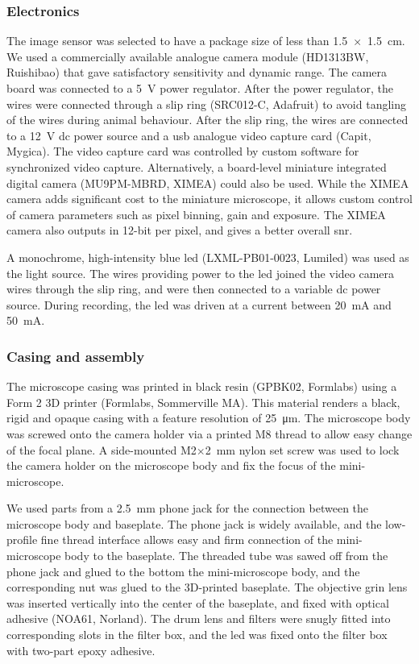 \subsubsection{Electronics}
The image sensor was selected to have a package size of less than \SI{1.5 x 1.5}{\cm}. We used a commercially available analogue camera module (HD1313BW, Ruishibao) that gave satisfactory sensitivity and dynamic range. The camera board was connected to a \SI{5}{\V} power regulator. After the power regulator, the wires were connected through a slip ring (SRC012-C, Adafruit) to avoid tangling of the wires during animal behaviour. After the slip ring, the wires are connected to a \SI{12}{\V} \gls{dc} power source and a \gls{usb} analogue video capture card (Capit, Mygica). The video capture card was controlled by custom software for synchronized video capture.  Alternatively, a board-level miniature integrated digital camera (MU9PM-MBRD, XIMEA) could also be used. While the XIMEA camera adds significant cost to the miniature microscope, it allows custom control of camera parameters such as pixel binning, gain and exposure. The XIMEA camera also outputs in 12-bit per pixel, and gives a better overall \gls{snr}.

A monochrome, high-intensity blue \gls{led} (LXML-PB01-0023, Lumiled) was used as the light source. The wires providing power to the \gls{led} joined the video camera wires through the slip ring, and were then connected to a variable \gls{dc} power source. During recording, the \gls{led} was driven at a current between \SI{20}{\mA} and \SI{50}{\mA}.

\subsubsection{Casing and assembly}
The microscope casing was printed in black resin (GPBK02, Formlabs) using a Form 2 3D printer (Formlabs, Sommerville MA). This material renders a black, rigid and opaque casing with a feature resolution of \SI{25}{\um}. The microscope body was screwed onto the camera holder via a printed M8 thread to allow easy change of the focal plane. A side-mounted M2$\times$\SI{2}{\mm} nylon set screw was used to lock the camera holder on the microscope body and fix the focus of the mini-microscope. 

We used parts from a \SI{2.5}{\mm} phone jack for the connection between the microscope body and baseplate. The phone jack is widely available, and the low-profile fine thread interface allows easy and firm connection of the mini-microscope body to the baseplate. The threaded tube was sawed off from the phone jack and glued to the bottom the mini-microscope body, and the corresponding nut was glued to the 3D-printed baseplate. The objective \gls{grin} lens was inserted vertically into the center of the baseplate, and fixed with optical adhesive (NOA61, Norland). The drum lens and filters were snugly fitted into corresponding slots in the filter box, and the \gls{led} was fixed onto the filter box with two-part epoxy adhesive. 


